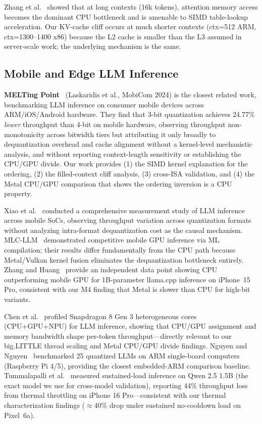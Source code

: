 \documentclass[conference]{IEEEtran}
\begin{document}
Zhang et al.~\cite{nomad_attention} showed that at long contexts (16k tokens),
attention memory access becomes the dominant CPU bottleneck and is amenable
to SIMD table-lookup acceleration. Our KV-cache cliff occurs at much shorter contexts
(ctx=512 ARM, ctx=1300--1400 x86) because the L2 cache is smaller than the L3 assumed
in server-scale work; the underlying mechanism is the same.

\subsection{Mobile and Edge LLM Inference}

\textbf{MELTing Point}~\cite{meltingpoint} (Laskaridis et al., MobiCom 2024) is the
closest related work, benchmarking LLM inference on consumer mobile devices across
ARM/iOS/Android hardware. They find that 3-bit quantization achieves 24.77\% \emph{lower}
throughput than 4-bit on mobile hardware, observing throughput non-monotonicity across
bitwidth tiers but attributing it only broadly to dequantization overhead and cache
alignment without a kernel-level mechanistic analysis, and without reporting
context-length sensitivity or establishing the CPU/GPU divide.
Our work provides (1) the SIMD kernel explanation for the ordering, (2) the
filled-context cliff analysis, (3) cross-ISA validation, and (4) the
Metal CPU/GPU comparison that shows the ordering inversion is a CPU property.

Xiao et al.~\cite{xiao_mobile} conducted a comprehensive measurement study of LLM
inference across mobile SoCs, observing throughput variation across quantization formats
without analyzing intra-format dequantization cost as the causal mechanism.
MLC-LLM~\cite{mlcllm} demonstrated competitive mobile GPU inference via ML compilation;
their results differ fundamentally from the CPU path because Metal/Vulkan kernel
fusion eliminates the dequantization bottleneck entirely.
Zhang and Huang~\cite{zhang_cpu_beats_gpu} provide an independent data point showing
CPU outperforming mobile GPU for 1B-parameter llama.cpp inference on iPhone~15 Pro,
consistent with our M4 finding that Metal is slower than CPU for high-bit variants.

Chen et al.~\cite{chen_heterollm} profiled Snapdragon 8 Gen 3 heterogeneous cores
(CPU+GPU+NPU) for LLM inference, showing that CPU/GPU assignment and memory
bandwidth shape per-token throughput---directly relevant to our big.LITTLE thread
scaling and Metal CPU/GPU divide findings.
Nguyen and Nguyen~\cite{nguyen_sbc} benchmarked 25 quantized LLMs on ARM single-board
computers (Raspberry Pi 4/5), providing the closest embedded-ARM comparison baseline.
Tummalapalli et al.~\cite{tummalapalli_edge} measured sustained-load inference on
Qwen 2.5 1.5B (the exact model we use for cross-model validation), reporting 44\%
throughput loss from thermal throttling on iPhone 16 Pro---consistent with our
thermal characterization findings ($\approx$40\% drop under sustained no-cooldown load on Pixel~6a).
\end{document}
